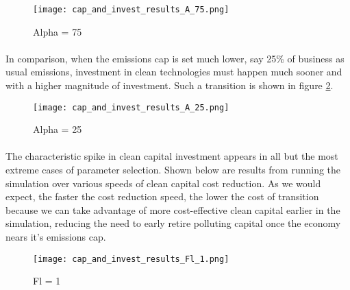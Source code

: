 \documentclass{easychithesis}
\begin{document}
\begin{figure}[h]
\texttt{[image: cap\_and\_invest\_results\_A\_75.png]}
\caption{Alpha = 75\label{fig:SimpleResultsA=75}}
\end{figure}



\FloatBarrier


\paragraph{} In comparison, when the emissions cap is set much lower, say 25\% of business as usual emissions, investment in clean technologies must happen much sooner and with a higher magnitude of investment. Such a transition is shown in figure \ref{fig:SimpleResultsA=25}. 

\begin{figure}[h]
\texttt{[image: cap\_and\_invest\_results\_A\_25.png]}
\caption{Alpha = 25\label{fig:SimpleResultsA=25}}
\end{figure}


\FloatBarrier

\paragraph{} The characteristic spike in clean capital investment appears in all but the most extreme cases of parameter selection. Shown below are results from running the simulation over various speeds of clean capital cost reduction. As we would expect, the faster the cost reduction speed, the lower the cost of transition because we can take advantage of more cost-effective clean capital earlier in the simulation, reducing the need to early retire polluting capital once the economy nears it's emissions cap. 



\begin{figure}[h]
\texttt{[image: cap\_and\_invest\_results\_Fl\_1.png]}
\caption{Fl = 1\label{fig:SimpleResultsFl=1}}
\end{figure}

\FloatBarrier
\end{document}
